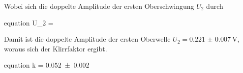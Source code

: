	Wobei sich die doppelte Amplitude der ersten Oberschwingung $U_{2}$ durch
	\begin{empheq}{equation}
		U_{2} = \footnotemark
		\label{eq:Oberwelle}
	\end{empheq}
	
	Damit ist die doppelte Amplitude der ersten Oberwelle $U_{2} = \SI{0.221(7)}{\volt}$,
	woraus sich der  Klirrfaktor ergibt.
	\begin{empheq}{equation}
		\label{eq:Klirrfaktor_Wert}
		k = \num{0.052(2)}
	\end{empheq}	